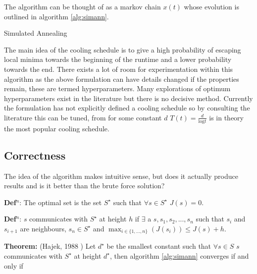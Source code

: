 \documentclass[a4paper,11pt]{report}
\begin{document}
The algorithm can be thought of as a markov chain $x(t)$ \cite{simulatedannealing} whose evolution is outlined in algorithm \ref{alg:simann}.

\begin{algorithm}[!h]
\caption{Simulated Annealing\label{alg:simann}\cite{kirkpatrick1983optimization}}
\begin{algorithmic}
\Else
{}
\Else{ }
\EndIf
\EndIf
\EndFor
\EndProcedure
\end{algorithmic}
\end{algorithm}

The main idea of the cooling schedule is to give a high probability of escaping local minima towards the beginning of the runtime and a lower probability towards the end. There exists a lot of room for experimentation within this algorithm as the above formulation can have details changed if the properties remain, these are termed hyperparameters. Many explorations of optimum hyperparameters exist in the literature but there is no decisive method. Currently the formulation has not explicitly defined a cooling schedule so by consulting the literature this can be tuned, from \cite{kirkpatrick1983optimization} for some constant $d$ $T(t)=\frac{d}{\text{log}t}$ is in theory the most popular cooling schedule. 

\subsection{Correctness}
The idea of the algorithm makes intuitive sense, but does it actually produce results and is it better than the brute force solution?

\textbf{Def$^n$}: The optimal set is the set $S^\star$ such that $\forall s \in S^\star$ $J(s)=0$. 

\textbf{Def$^n$}: $s$ communicates with $S^\star$ at height $h$ if $\exists$ a $s,s_1,s_2,...,s_n$ such that $s_i$ and $s_{i+1}$ are neighbours, $s_n\in S^\star$ and $\max_{i\in\{1,...,n\}}(J(s_i))\leq J(s)+h$. 

\textbf{Theorem:} (Hajek, 1988 \cite{sasaki1988time}) Let $d^\star$ be the smallest constant such that $\forall s\in S$ $s$ communicates with $S^\star$ at height $d^\star$, then algorithm \ref{alg:simann} converges if and only if 
\end{document}
